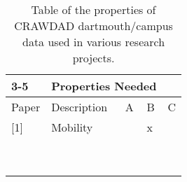 \begin{table}\begin{tabular}{|l|l|l|l|l|}
\cline{3-5}
\multicolumn{2}{}{} & \multicolumn{3}{|l|}{Properties Needed} \\ \hline
Paper    & Description & A           & B           & C          \\ \hline
{[}1{]}  & Mobility    &             & x           &            \\ \hline
         &             &             &             &            \\ \hline
         &             &             &             &            \\ \hline
         &             &             &             &            \\ \hline
         &             &             &             &            \\ \hline
         &             &             &             &            \\ \hline
         &             &             &             &            \\ \hline
         &             &             &             &            \\ \hline
         &             &             &             &            \\ \hline
         &             &             &             &            \\ \hline
\end{tabular}
\caption{Table of the properties of CRAWDAD dartmouth/campus data used in various research projects.}
\end{table}